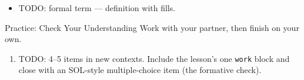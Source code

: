 \documentclass[12pt]{article}
\newcommand{\answerspace}[2]{\par\nopagebreak\noindent\begin{minipage}[t][#1][t]{\linewidth}%
  \color{keyred}\bfseries #2\end{minipage}\par}
\begin{document}
\boxguard[16]
\begin{tcolorbox}[enhanced, colback=sky, colframe=navy, boxrule=0.8pt, arc=2mm,
    left=3mm, right=3mm, top=2mm, bottom=2mm, breakable,
    fonttitle=\bfseries\small\color{white}, title={QuickNotes: TODO Topic},
    attach boxed title to top left={yshift=-2mm, xshift=4mm},
    boxed title style={colback=navy, colframe=navy, arc=1.5mm}]
\begin{itemize}[leftmargin=1.1em, itemsep=8pt]
  \item TODO: formal term --- definition with \blank{2.4cm} fills.
\end{itemize}
\end{tcolorbox}

\boxguard[16]
\begin{notesbox}{Practice: Check Your Understanding}
Work with your partner, then finish on your own.
\begin{enumerate}[leftmargin=1.7em, itemsep=10pt]
  \item TODO: 4--5 items in new contexts. Include the lesson's one \texttt{work} block and
        close with an SOL-style multiple-choice item (the formative check).
        \answerspace{1.6cm}{}
\end{enumerate}
\end{notesbox}
\end{document}

